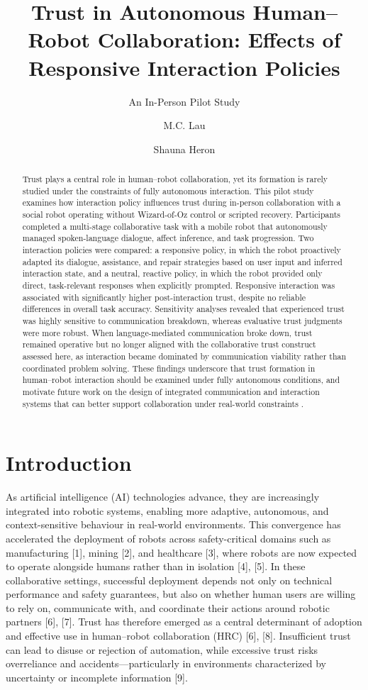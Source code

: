 \documentclass[
  letterpaper,
  DIV=11,
  numbers=noendperiod]{scrartcl}
\title{Trust in Autonomous Human--Robot Collaboration: Effects of
Responsive Interaction Policies}
\subtitle{An In-Person Pilot Study}
\author{M.C. Lau \and Shauna Heron}
\date{}
\begin{document}
\maketitle
\begin{abstract}
Trust plays a central role in human--robot collaboration, yet its
formation is rarely studied under the constraints of fully autonomous
interaction. This pilot study examines how interaction policy influences
trust during in-person collaboration with a social robot operating
without Wizard-of-Oz control or scripted recovery. Participants
completed a multi-stage collaborative task with a mobile robot that
autonomously managed spoken-language dialogue, affect inference, and
task progression. Two interaction policies were compared: a responsive
policy, in which the robot proactively adapted its dialogue, assistance,
and repair strategies based on user input and inferred interaction
state, and a neutral, reactive policy, in which the robot provided only
direct, task-relevant responses when explicitly prompted. Responsive
interaction was associated with significantly higher post-interaction
trust, despite no reliable differences in overall task accuracy.
Sensitivity analyses revealed that experienced trust was highly
sensitive to communication breakdown, whereas evaluative trust judgments
were more robust. When language-mediated communication broke down, trust
remained operative but no longer aligned with the collaborative trust
construct assessed here, as interaction became dominated by
communication viability rather than coordinated problem solving. These
findings underscore that trust formation in human--robot interaction
should be examined under fully autonomous conditions, and motivate
future work on the design of integrated communication and interaction
systems that can better support collaboration under real-world
constraints .
\end{abstract}


\section{Introduction}\label{introduction}

As artificial intelligence (AI) technologies advance, they are
increasingly integrated into robotic systems, enabling more adaptive,
autonomous, and context-sensitive behaviour in real-world environments.
This convergence has accelerated the deployment of robots across
safety-critical domains such as manufacturing {[}1{]}, mining {[}2{]},
and healthcare {[}3{]}, where robots are now expected to operate
alongside humans rather than in isolation {[}4{]}, {[}5{]}. In these
collaborative settings, successful deployment depends not only on
technical performance and safety guarantees, but also on whether human
users are willing to rely on, communicate with, and coordinate their
actions around robotic partners {[}6{]}, {[}7{]}. Trust has therefore
emerged as a central determinant of adoption and effective use in
human--robot collaboration (HRC) {[}6{]}, {[}8{]}. Insufficient trust
can lead to disuse or rejection of automation, while excessive trust
risks overreliance and accidents---particularly in environments
characterized by uncertainty or incomplete information {[}9{]}.
\end{document}
